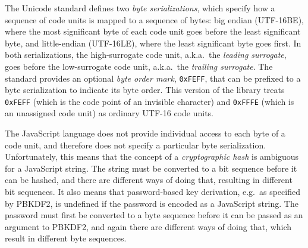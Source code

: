\documentclass[12pt]{article}
\begin{document}
The Unicode standard defines two {\em byte serializations}, which specify how
a sequence of code units is mapped to a sequence of bytes: big endian (UTF-16BE), where the most significant byte of each code unit goes before
the least significant byte, and little-endian (UTF-16LE), where the least 
significant byte goes first.  In both serializations, the high-surrogate
code unit, a.k.a.\ the {\em leading surrogate}, goes
before the low-surrogate code unit, a.k.a.\ the {\em trailing surrogate}.
The standard provides an optional {\em byte order mark}, {\tt 0xFEFF},
that can be prefixed to a byte serialization to indicate its byte order.
This version of the library treats {\tt 0xFEFF} (which is the code point of
an invisible character) and {\tt 0xFFFE} (which is an unassigned code unit)
as ordinary UTF-16 code units.

The JavaScript language does not provide individual access to each byte
of a code unit, and therefore does not specify a particular byte serialization.
Unfortunately, this means that
the concept of a {\em cryptographic hash\/} is ambiguous
for a JavaScript string.  The string must be converted to a bit sequence
before it can be hashed,
and there are different ways of doing that, resulting in different bit sequences.
It also means that password-based key derivation, e.g.\ as specified by 
PBKDF2, is undefined if the password is encoded as a JavaScript string.
The password must first be converted to a byte sequence before it can be
passed as an argument to PBKDF2, and again
there are different ways of doing that, which result in different byte sequences.
\end{document}
